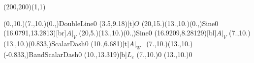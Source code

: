 \unitlength=1bp%

\begin{feynartspicture}(200,200)(1,1)

\FADiagram{}
\FAProp(0.,10.)(7.,10.)(0.,){DoubleLine}{0}
\FALabel(3.5,9.18)[t]{$O$}
\FAProp(20,15.)(13.,10.)(0.,){Sine}{0}
\FALabel(16.0791,13.2813)[br]{$A|_V$}
\FAProp(20,5.)(13.,10.)(0.,){Sine}{0}
\FALabel(16.9209,8.28129)[bl]{$A|_V$}
\FAProp(7.,10.)(13.,10.)(0.833,){ScalarDash}{0}
\FALabel(10.,6.681)[t]{$A|_{W^\perp}$}
\FAProp(7.,10.)(13.,10.)(-0.833,){BandScalarDash}{0}
\FALabel(10.,13.319)[b]{$L_\varepsilon$}
\FAVert(7.,10.){0}
\FAVert(13.,10.){0}
\end{feynartspicture}

